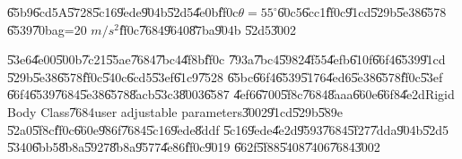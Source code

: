 \begin{case}
\U{65b9}\U{6cd5}A\U{5728}\U{5c16}\U{9ede}\U{904b}\U{52d5}\U{4e0b}\U{ff0c}$%
\theta =55^{\circ }$\U{60c5}\U{6cc1}\U{ff0c}\U{91cd}\U{529b}\U{5e38}\U{6578}%
\U{6539}\U{70ba}g=20 $m/s^{2}$\U{ff0c}\U{7684}\U{9640}\U{87ba}\U{904b}%
\U{52d5}\U{3002}
\end{case}

\U{53e6}\U{4e00}\U{500b}\U{7c21}\U{55ae}\U{7684}\U{7bc4}\U{4f8b}\U{ff0c}%
\U{793a}\U{7bc4}\U{5982}\U{4f55}\U{4efb}\U{610f}\U{66f4}\U{6539}\U{91cd}%
\U{529b}\U{5e38}\U{6578}\U{ff0c}\U{540c}\U{6cd5}\U{53ef}\U{61c9}\U{7528}%
\U{65bc}\U{66f4}\U{6539}\U{5176}\U{4ed6}\U{5e38}\U{6578}\U{ff0c}\U{53ef}%
\U{66f4}\U{6539}\U{7684}\U{5e38}\U{6578}\U{8acb}\U{53c3}\U{8003}\U{6587}%
\U{4ef6}\U{6700}\U{5f8c}\U{7684}\U{8aaa}\U{660e}\U{66f8}\U{4e2d}Rigid Body
Class\U{7684}user adjustable parameters\U{3002}\U{91cd}\U{529b}\U{589e}%
\U{52a0}\U{5f8c}\U{ff0c}\U{660e}\U{986f}\U{7684}\U{5c16}\U{9ede}\U{8ddf}%
\U{5c16}\U{9ede}\U{4e2d}\U{9593}\U{7684}\U{5f27}\U{7dda}\U{904b}\U{52d5}%
\U{5340}\U{6bb5}\U{8b8a}\U{5927}\U{8b8a}\U{9577}\U{4e86}\U{ff0c}\U{9019}%
\U{662f}\U{5f88}\U{5408}\U{7406}\U{7684}\U{3002}

%
\begin{center}

\end{center}%

\clearpage%

